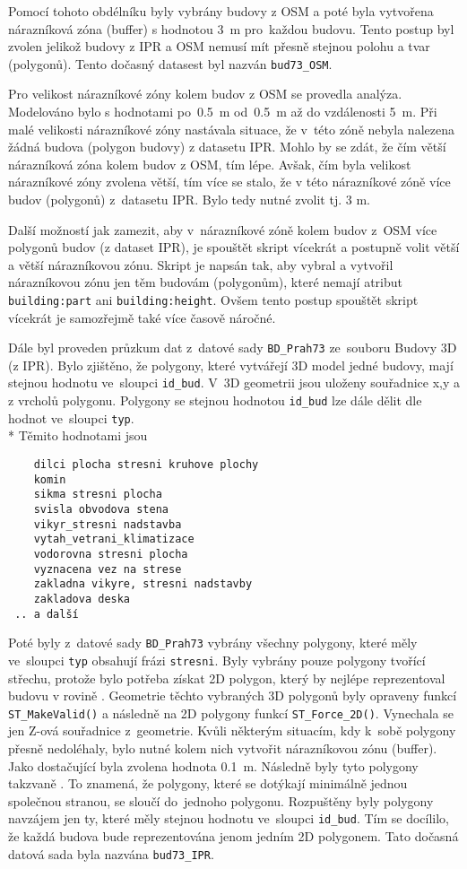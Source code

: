 Pomocí tohoto obdélníku byly vybrány budovy z OSM a poté byla vytvořena nárazníková zóna (buffer) s hodnotou
3~m pro~každou budovu. Tento postup byl zvolen jelikož budovy z IPR a
OSM nemusí mít přesně stejnou polohu a tvar (polygonů). Tento dočasný
datasest byl nazván {\tt bud73\_OSM}.

Pro velikost nárazníkové zóny kolem budov z OSM se provedla analýza.
Modelováno bylo s hodnotami po~0.5~m od~0.5~m až do vzdálenosti 5~m.
Při malé velikosti nárazníkové zóny nastávala situace, že v~této zóně
nebyla nalezena žádná budova (polygon budovy) z datasetu IPR. Mohlo by
se zdát, že čím větší nárazníková zóna kolem budov z OSM, tím lépe.
Avšak, čím byla velikost nárazníkové zóny zvolena větší, tím více se
stalo, že v této nárazníkové zóně  více budov (polygonů)
z~datasetu IPR. Bylo tedy nutné zvolit  tj. 3 m.

Další možností jak zamezit, aby v~nárazníkové zóně kolem budov
z~OSM  více polygonů budov (z dataset IPR), je spouštět skript
vícekrát a postupně volit větší a větší nárazníkovou zónu. Skript je
napsán tak, aby vybral a vytvořil nárazníkovou zónu jen těm budovám
(polygonům), které nemají atribut {\tt building:part} ani
{\tt building:height}. Ovšem tento postup spouštět skript vícekrát je
samozřejmě také více časově náročné.

Dále byl proveden průzkum dat z~datové sady {\tt BD\_Prah73} 
ze~souboru Budovy 3D (z IPR). Bylo zjištěno, že polygony, které
vytvářejí 3D model jedné budovy, mají stejnou hodnotu ve~sloupci
{\tt id\_bud}. V~3D geometrii jsou uloženy  souřadnice
x,y a z vrcholů polygonu. Polygony se
stejnou hodnotou {\tt id\_bud} lze dále dělit dle hodnot
ve~sloupci {\tt typ}.
\\*
Těmito hodnotami jsou
\begin{verbatim}
    dilci plocha stresni kruhove plochy
    komin
    sikma stresni plocha
    svisla obvodova stena
    vikyr_stresni nadstavba
    vytah_vetrani_klimatizace
    vodorovna stresni plocha
    vyznacena vez na strese
    zakladna vikyre, stresni nadstavby
    zakladova deska
 .. a další
\end{verbatim}

Poté byly z~datové sady {\tt BD\_Prah73} vybrány všechny polygony,
které měly ve~sloupci {\tt typ} obsahují frázi {\tt stresni}.
Byly vybrány pouze polygony tvořící střechu,
protože bylo potřeba získat 2D polygon, který by nejlépe reprezentoval budovu v rovině .
Geometrie těchto vybraných 3D polygonů byly opraveny funkcí
{\tt ST\_MakeValid()} a následně  na 2D polygony funkcí
{\tt ST\_Force\_2D()}. Vynechala se jen Z-ová souřadnice z~geometrie.
Kvůli některým situacím, kdy k~sobě polygony přesně nedoléhaly, bylo
nutné kolem nich vytvořit nárazníkovou zónu (buffer). Jako dostačující
byla zvolena hodnota 0.1~m. Následně byly tyto polygony takzvaně
. To znamená, že polygony, které se dotýkají
minimálně jednou společnou stranou, se sloučí do~jednoho polygonu.
Rozpuštěny byly polygony navzájem jen ty, které měly stejnou hodnotu
ve~sloupci {\tt id\_bud}. Tím se docílilo, že každá budova bude
reprezentována jenom jedním 2D polygonem. Tato dočasná datová sada
byla nazvána {\tt bud73\_IPR}.

